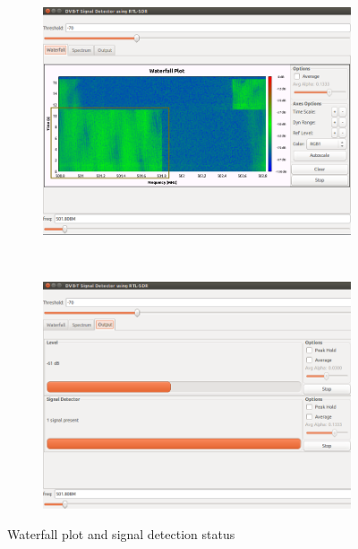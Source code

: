 \begin{figure}[H]
    \centering
    \begin{subfigure}[b]{0.4\textwidth}
        \includegraphics[width=\textwidth]{figures/waterfall-1}
    \end{subfigure}
    ~ %
    \begin{subfigure}[b]{0.4\textwidth}
        \includegraphics[width=\textwidth]{figures/detection-1}
    \end{subfigure}
    \caption{Waterfall plot and signal detection status}\label{fig:gnu-signal-detect}
\end{figure}

